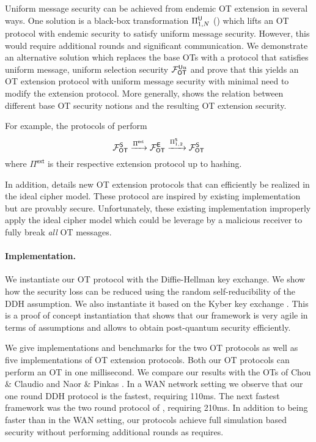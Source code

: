 Uniform message security can be achieved from endemic OT extension in several ways. One solution is a black-box transformation $\Pi^\mathsf{U}_{1,N}$ () which lifts an OT protocol with endemic security to satisfy uniform message security. However, this would require additional rounds and significant communication. We demonstrate an alternative solution which replaces the base OTs with a protocol that satisfies uniform message, uniform selection security $\mathcal{F}_{\mathsf{OT}}^{\mathsf{U} u}$ and prove that this yields an OT extension protocol with uniform message security with minimal need to modify the extension protocol. More generally,  shows the relation between different base OT security notions and the resulting OT extension security. 

\iffullversion
For example, the protocols of \cite{C:IKNP03,EC:ALSZ15,C:KelOrsSch15} perform
$$
\mathcal{F}_{\mathsf{OT}}^\mathsf{S} \xrightarrow{\Pi^{\textsf{ext}}} \mathcal{F}_{\mathsf{OT}}^\mathsf{E} \xrightarrow{\Pi^{\mathsf{S}}_{1,2}} \mathcal{F}_{\mathsf{OT}}^\mathsf{S}
$$
where $\Pi^\textsf{ext}$ is their respective extension protocol up to hashing.
\fi

In addition,  details new OT extension protocols that can efficiently be realized in the ideal cipher model. These protocol are inspired by existing implementation \cite{libOTe,KOS,EMP} but are provably secure. Unfortunately, these existing implementation improperly apply the ideal cipher model which could be leverage by a malicious receiver to fully break \emph{all} OT messages. 


\paragraph{Implementation.} We instantiate our OT protocol with the Diffie-Hellman key exchange. We show how the security loss can be reduced using the random self-reducibility of the DDH assumption. 
We also instantiate it based on the Kyber key exchange \cite{EPRINT:BDKLLS17,NISTPQC-R1:CRYSTALS-KYBER17}. This is a proof of concept instantiation that shows that our framework is very agile in terms of assumptions and allows to obtain post-quantum security efficiently. 

We give implementations and benchmarks for the two OT protocols as well as five implementations of OT extension protocols. Both our OT protocols can perform an OT in one millisecond. We compare our results with the OTs of Chou \& Claudio \cite{LC:ChoOrl15} and Naor \& Pinkas \cite{SODA:NaoPin01}. In a WAN network setting we observe that our one round DDH protocol is the fastest, requiring 110ms. The next fastest framework was the two round protocol of \cite{LC:ChoOrl15}, requiring 210ms. In addition to being faster than \cite{LC:ChoOrl15} in the WAN setting, our protocols achieve full simulation based security without performing additional rounds as \cite{LC:ChoOrl15} requires. 

